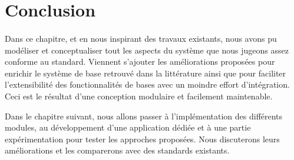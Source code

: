 \section{Conclusion}
\paragraph{}
Dans ce chapitre, et en nous inspirant des travaux existants, nous avons pu modéliser et conceptualiser tout les aspects du système que nous jugeons assez conforme au standard. Viennent s'ajouter les améliorations proposées pour enrichir le système de base retrouvé dans la littérature ainsi que pour faciliter l'extensibilité des fonctionnalités de bases avec un moindre effort d'intégration. Ceci est le résultat d'une conception modulaire et facilement maintenable. 
\par Dans le chapitre suivant, nous allons passer à l'implémentation des différents modules, au développement d'une application dédiée et à une partie expérimentation pour tester les approches proposées. Nous discuterons leurs améliorations et les comparerons avec des standards existants.

